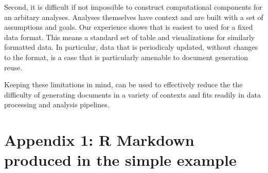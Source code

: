 \documentclass[
]{jss}
\begin{document}
Second, it is difficult if not impossible to construct computational
components for an arbitary analyses. Analyses themselves have context
and are built with a set of assumptions and goals. Our experience shows
that  is easiest to used for a fixed data format. This
means a standard set of table and visualizations for similarly formatted
data. In particular, data that is periodicaly updated, without changes
to the format, is a case that is particularly amenable to document
generation reuse.

Keeping these limitations in mind,  can be used to
effectively reduce the the difficulty of generating documents in a
variety of contexts and fits readily in data processing and analysis
pipelines.



\section*{Appendix 1: R Markdown produced in the simple example}
\label{appendix}
\end{document}
